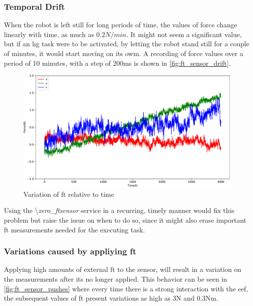 \subsubsection{Temporal Drift}

\par When the robot is left still for long periods of time, the values of force change linearly with time, as much as $0.2\si{N}/\si{min}$. It might not seem a significant value, but if an \ac{hg} task were to be activated, by letting the robot stand still for a couple of minutes, it would start moving on its owm. A recording of force values over a period of 10 minutes, with a step of 200ms is shown in \autoref{fig:ft_sensor_drift}. 

\begin{figure}[h]
    \centering
    \includegraphics[width=0.8\linewidth]{figs/chp3/ft_sensor_drift.pdf}
    \caption{Variation of \ac{ft} relative to time}
    \label{fig:ft_sensor_drift}
\end{figure}

\par Using the \textbackslash\textit{zero\_ftsensor} service in a recurring, timely manner would fix this problem but raise the issue on when to do so, since it might also erase important \ac{ft} measurements needed for the executing task.

\subsubsection{Variations caused by appliying \ac{ft}}

\par Applying high amounts of external \ac{ft} to the sensor, will result in a variation on the measurements after its no longer applied. This behavior can be seen in \autoref{fig:ft_sensor_pushes} where every time there is a strong interaction with the \ac{eef}, the subsequent values of \ac{ft} present variations as high as 3N and 0.3Nm.

